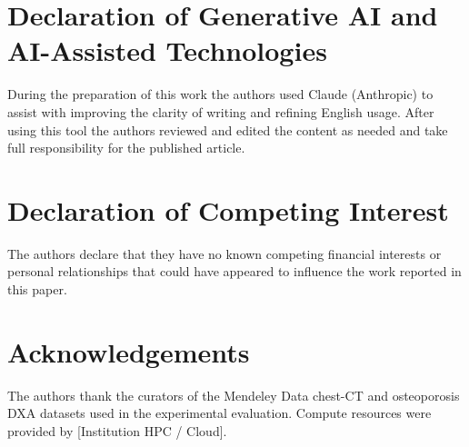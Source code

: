 \documentclass[preprint,12pt]{elsarticle}
\begin{document}
\section*{Declaration of Generative AI and AI-Assisted Technologies}

During the preparation of this work the authors used Claude (Anthropic) to
assist with improving the clarity of writing and refining English usage.
After using this tool the authors reviewed and edited the content as needed
and take full responsibility for the published article.

\section*{Declaration of Competing Interest}

The authors declare that they have no known competing financial interests
or personal relationships that could have appeared to influence the work
reported in this paper.

\section*{Acknowledgements}

The authors thank the curators of the Mendeley Data chest-CT and osteoporosis
DXA datasets used in the experimental evaluation.
Compute resources were provided by [Institution HPC / Cloud].



\end{document}
